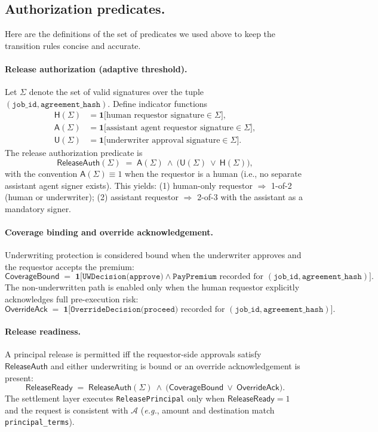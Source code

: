 \documentclass{article} %
\begin{document}
\subsection{Authorization predicates.}
Here are the definitions of the set of predicates we used above to keep the transition rules concise and accurate.

\paragraph{Release authorization (adaptive threshold).}
Let $\Sigma$ denote the set of valid signatures over the tuple $(\texttt{job\_id}, \texttt{agreement\_hash})$. Define indicator functions
\[
\begin{aligned}
\mathsf{H}(\Sigma) &= \mathbf{1}\big[\text{human requestor signature} \in \Sigma\big],\\
\mathsf{A}(\Sigma) &= \mathbf{1}\big[\text{assistant agent requestor signature} \in \Sigma\big],\\
\mathsf{U}(\Sigma) &= \mathbf{1}\big[\text{underwriter approval signature} \in \Sigma\big].
\end{aligned}
\]
The release authorization predicate is
\[
\mathsf{ReleaseAuth}(\Sigma) \;=\; \mathsf{A}(\Sigma)\ \wedge\ \big(\mathsf{U}(\Sigma)\ \vee\ \mathsf{H}(\Sigma)\big),
\]
with the convention $\mathsf{A}(\Sigma)\equiv 1$ when the requestor is a human (i.e., no separate assistant agent signer exists). This yields: (1) human-only requestor $\Rightarrow$ 1-of-2 (human or underwriter); (2) assistant requestor $\Rightarrow$ 2-of-3 with the assistant as a mandatory signer.

\paragraph{Coverage binding and override acknowledgement.}
Underwriting protection is considered bound when the underwriter approves and the requestor accepts the premium:
\[
\mathsf{CoverageBound} \;=\; \mathbf{1}\big[\texttt{UWDecision(approve)} \wedge \texttt{PayPremium} \text{ recorded for } (\texttt{job\_id},\texttt{agreement\_hash})\big].
\]
The non-underwritten path is enabled only when the human requestor explicitly acknowledges full pre-execution risk:
\[
\mathsf{OverrideAck} \;=\; \mathbf{1}\big[\texttt{OverrideDecision(proceed)} \text{ recorded for } (\texttt{job\_id},\texttt{agreement\_hash})\big].
\]

\paragraph{Release readiness.}
A principal release is permitted iff the requestor-side approvals satisfy $\mathsf{ReleaseAuth}$ and either underwriting is bound or an override acknowledgement is present:
\[
\mathsf{ReleaseReady} \;=\; \mathsf{ReleaseAuth}(\Sigma)\ \wedge\ \big(\mathsf{CoverageBound}\ \vee\ \mathsf{OverrideAck}\big).
\]
The settlement layer executes \texttt{ReleasePrincipal} only when $\mathsf{ReleaseReady}=1$ and the request is consistent with $\mathcal{A}$ (\emph{e.g.}, amount and destination match \texttt{principal\_terms}).
\end{document}
